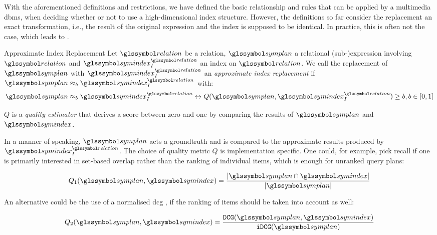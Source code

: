 With the aforementioned definitions and restrictions, we have defined the basic relationship and rules that can be applied by a multimedia \acrshort{dbms}, when deciding whether or not to use a high-dimensional index structure. However, the definitions so far consider the replacement an exact transformation, i.e., the result of the original expression and the index is supposed to be identical. In practice, this is often not the case, which leads to .

\begin{definition}[label=definition:index_replacement_approximate]{Approximate Index Replacement}{}
    Let $\relation$ be a relation, $\symplan$ a relational (sub-)expression involving $\relation$ and $\symindex^{\relation}_{I}$ an index on $\relation$. We call the replacement of $\symplan$ with $\symindex^{\relation}_{I}$ an \emph{approximate index replacement} if $\symplan \approx_{b} \symindex^{\relation}_{I}$ with:
    \begin{equation*}
        \symplan \approx_{b} \symindex^{\relation}_{I} \leftrightarrow Q(\symplan,\symindex^{\relation}_{I}) \geq b, b \in [0, 1]
    \end{equation*}

     $Q$ is a \emph{quality estimator} that derives a score between zero and one by comparing the results of $\symplan$ and $\symindex$.
\end{definition}  

In a manner of speaking, $\symplan$ acts a groundtruth and is compared to the approximate results produced by $\symindex^{\relation}_{I}$. The choice of quality metric $Q$ is implementation specific. One could, for example, pick recall if one is primarily interested in set-based overlap rather than the ranking of individual items, which is enough for unranked query plans:

\begin{equation*}
        Q_1(\symplan,\symindex) = \frac{|\symplan \cap \symindex|}{|\symplan|}
\end{equation*}

An alternative could be the use of a normalised \acrfull{dcg} \cite{Jarvelin:2002Cumulated}, if the ranking of items should be taken into account as well:

\begin{equation*}
    Q_2(\symplan,\symindex) = \frac{\mathtt{DCG}(\symplan,\symindex)}{\mathtt{iDCG}(\symplan)}
\end{equation*}


